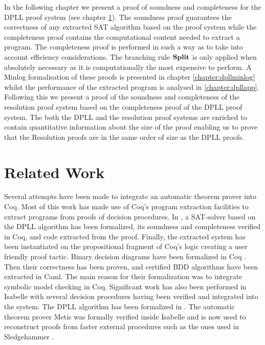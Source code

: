  \label{chapter:dpll}
In the following chapter we present a proof of soundness and completeness for the DPLL proof system (see chapter \ref{}). The soundness proof guarantees the correctness of any extracted SAT algorithm based on the proof system while the completeness proof contains the computational content needed to extract a program. The completeness proof is performed in such a way as to take into account efficiency considerations. The branching rule $\mathbf{Split}$ is only applied when absolutely necessary as it is computationally the most expensive to perform. A Minlog formalisation of these proofs is presented in chapter \ref{chapter:dpllminlog} whilst the performance of the extracted program is analysed in \ref{chapter:dpllapp}. Following this we present a proof of the soundness and completeness of the resolution proof system based on the completeness proof of the DPLL proof system. The both the DPLL and the resolution proof systems are enriched to contain quantitative information about the size of the proof enabling us to prove that the Resolution proofs are in the same order of size as the DPLL proofs. 

\section{Related Work}
Several attempts have been made to integrate an automatic theorem prover into Coq. Most of this work has made use of Coq's program extraction facilities to extract programs from proofs of decision procedures.
 In \cite{SL08}, a SAT-solver based on the DPLL algorithm has been
formalized, its soundness and completeness verified in Coq,
and code extracted from the proof.
Finally, the extracted system has been instantiated on the propositional fragment of Coq's logic creating a user friendly proof tactic.  Binary decision diagrams have been formalized in Coq \cite{KV00}. Then their correctness has been proven, and certified BDD algorithms have been extracted in Caml. The main reason for their formalization was to integrate symbolic model checking in Coq.
%
Significant work has also been performed in Isabelle with several decision procedures having been verified and integrated into the system. The DPLL algorithm has been formalized in \cite{FM10}. The automatic theorem prover Metis \cite{LP07} was formally verified inside Isabelle and is now used to reconstruct proofs from faster external procedures such as the ones used in Sledgehammer \cite{SB10}.

